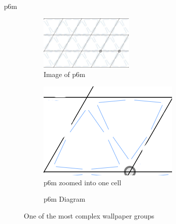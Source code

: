\documentclass{beamer}
\theoremstyle{definition}
\begin{document}
\begin{frame}{p6m}
    \begin{figure}{\textwidth}
        \centering
        \begin{minipage}{0.6\textwidth}
            \centering
            \begin{subfigure}[b]{\textwidth}
                \centering
                \includegraphics[width=0.5\textwidth]{Figures/p6m/p6m_full.JPG}
                \caption{Image of p6m}
                \label{fig:p6m_full}
            \end{subfigure}
            \vfill
            \begin{subfigure}[b]{\linewidth}
                \centering
                \includegraphics[width=0.5\linewidth]{Figures/p6m/p6m_simplified.png}
                \caption{p6m zoomed into one cell}
                \label{fig:p6m_zoomed}
            \end{subfigure}
        \end{minipage}
        \hspace{-2cm} %
        \begin{minipage}{0.35\textwidth}
            \begin{subfigure}[b]{\textwidth}
                \centering
                \scalebox{0.55}{}
                \caption{p6m Diagram}
                \label{fig:p6m_diagram}
            \end{subfigure}
        \end{minipage}
        \caption{One of the most complex wallpaper groups}
        \label{fig:The four ps}
    \end{figure}
\end{frame}
\end{document}
